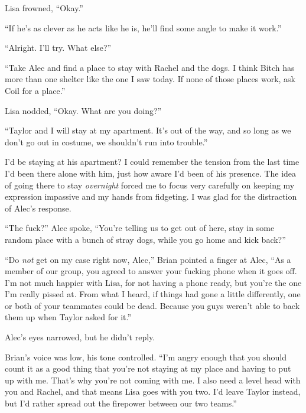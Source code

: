 Lisa frowned, ``Okay.''



``If he's as clever as he acts like he is, he'll find some angle to make it work.''



``Alright.  I'll try.  What else?''



``Take Alec and find a place to stay with Rachel and the dogs.  I think Bitch has more than one shelter like the one I saw today.  If none of those places work, ask Coil for a place.''



Lisa nodded, ``Okay.  What are you doing?''



``Taylor and I will stay at my apartment.  It's out of the way, and so long as we don't go out in costume, we shouldn't run into trouble.''



I'd be staying at his apartment?  I could remember the tension from the last time I'd been there alone with him, just how aware I'd been of his presence.  The idea of going there to stay \emph{overnight} forced me to focus very carefully on keeping my expression impassive and my hands from fidgeting.  I was glad for the distraction of Alec's response.



``The fuck?'' Alec spoke, ``You're telling us to get out of here, stay in some random place with a bunch of stray dogs, while you go home and kick back?''



``Do \emph{not} get on my case right now, Alec,'' Brian pointed a finger at Alec, ``As a member of our group, you agreed to answer your fucking phone when it goes off.  I'm not much happier with Lisa, for not having a phone ready, but you're the one I'm really pissed at.  From what I heard, if things had gone a little differently, one or both of your teammates could be dead.  Because you guys weren't able to back them up when Taylor asked for it.''



Alec's eyes narrowed, but he didn't reply.



Brian's voice was low, his tone controlled.  ``I'm angry enough that you should count it as a good thing that you're not staying at my place and having to put up with me.  That's why you're not coming with me.  I also need a level head with you and Rachel, and that means Lisa goes with you two.  I'd leave Taylor instead, but I'd rather spread out the firepower between our two teams.''



